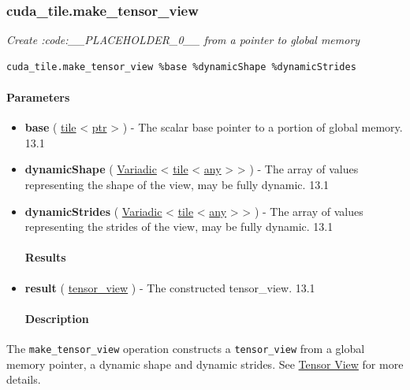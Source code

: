 \documentclass{article}
\begin{document}
\subsubsection{cuda\_tile.make\_tensor\_view}

\textit{Create :code:\_\_PLACEHOLDER\_0\_\_ from a pointer to global memory}


\begin{lstlisting}
cuda_tile.make_tensor_view %base %dynamicShape %dynamicStrides
\end{lstlisting}

\paragraph{Parameters}

\begin{itemize}
\item \textbf{base} ( \href{https://docs.nvidia.com/cuda/tile-ir/latest/sections/types.html#type-tile}{tile} < \href{https://docs.nvidia.com/cuda/tile-ir/latest/sections/types.html#type-ptr}{ptr} > ) - The scalar base pointer to a portion of global memory. 13.1
\item \textbf{dynamicShape} ( \href{https://docs.nvidia.com/cuda/tile-ir/latest/sections/operations.html#type-variadic}{Variadic} < \href{https://docs.nvidia.com/cuda/tile-ir/latest/sections/types.html#type-tile}{tile} < \href{https://docs.nvidia.com/cuda/tile-ir/latest/sections/operations.html#type-any}{any} > > ) - The array of values representing the shape of the view, may be fully dynamic. 13.1
\item \textbf{dynamicStrides} ( \href{https://docs.nvidia.com/cuda/tile-ir/latest/sections/operations.html#type-variadic}{Variadic} < \href{https://docs.nvidia.com/cuda/tile-ir/latest/sections/types.html#type-tile}{tile} < \href{https://docs.nvidia.com/cuda/tile-ir/latest/sections/operations.html#type-any}{any} > > ) - The array of values representing the strides of the view, may be fully dynamic. 13.1


\paragraph{Results}

\item \textbf{result} ( \href{https://docs.nvidia.com/cuda/tile-ir/latest/sections/types.html#type-tensor-view}{tensor\_view} ) - The constructed tensor\_view. 13.1


\paragraph{Description}

\end{itemize}
The \texttt{make\_tensor\_view} operation constructs a \texttt{tensor\_view} from a global memory pointer, a dynamic shape and dynamic strides. See \href{https://docs.nvidia.com/cuda/tile-ir/latest/sections/types.html#type-tensor-view}{Tensor View} for more details.
\end{document}
